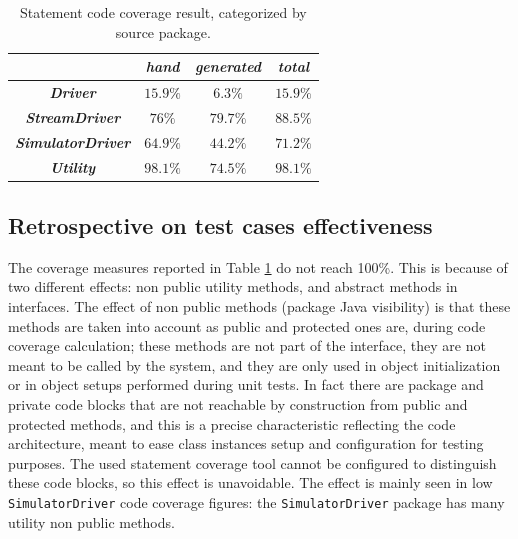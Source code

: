 \documentclass{article}
\newcommand{\lil}[1]{\texttt{\lstinline|#1|}}
\begin{document}
\begin{table}[htbp]
  \caption{Statement code coverage result, categorized by source package.}
  \label{tab:statement_code_coverage}
  \begin{center}
    \begin{tabular}{|c|c|c|c|}\hline
      & \textbf{\textit{hand}} & \textbf{\textit{generated}} &
      \textbf{\textit{total}} \\\hline
      \textbf{\textit{Driver}} & $15.9 \%$ & $6.3 \%$ & $15.9 \%$ \\\hline
      \textbf{\textit{StreamDriver}} & $76 \%$ & $79.7 \%$ & $88.5 \%$ \\\hline
      \textbf{\textit{SimulatorDriver}} & $64.9 \%$ & $44.2 \%$ &
      $71.2 \%$ \\\hline
      \textbf{\textit{Utility}} & $98.1 \%$ & $74.5 \%$ & $98.1 \%$ \\\hline
    \end{tabular}
  \end{center}
\end{table}



\subsection{Retrospective on test cases effectiveness}
\label{subsec:test_cases_retrospectives}

The coverage measures reported in Table \ref{tab:statement_code_coverage} do not reach 100\%. 
This is because of two different effects: non public utility methods, and abstract methods in interfaces.
The effect of non public methods (package Java visibility) is that these methods are taken into account as public and protected ones are, during code coverage calculation; these methods are not part of the interface, they are not meant to be called by the system, and they are only used in object initialization or in object setups performed during unit tests. 
In fact there are package and private code blocks that are not reachable by construction from public and protected methods, and this is a precise characteristic reflecting the code architecture, meant to ease class instances setup and configuration for testing purposes. 
The used statement coverage tool cannot be configured to distinguish these code blocks, so this effect is unavoidable. 
The effect is mainly seen in low \lil{SimulatorDriver} code coverage figures: the \lil{SimulatorDriver} package has many utility non public methods.
\end{document}
